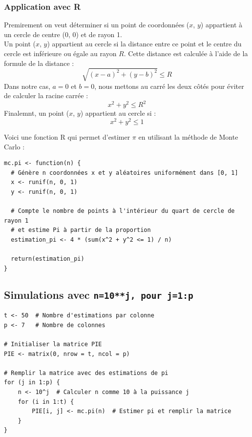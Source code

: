 \documentclass[a4paper,12pt]{article}
\begin{document}
\subsubsection{Application avec R}

Premirement on veut déterminer si un point de coordonnées ($x$, $y$) appartient à un cercle de centre (0, 0) et de rayon 1.
\\[1\baselineskip]
Un point ($x$, $y$) appartient au cercle si la distance entre ce point et le centre du cercle est inférieure ou égale au rayon $R$. Cette distance est calculée à l'aide de la formule de la distance :
\[
\sqrt{(x - a)^2 + (y - b)^2} \leq R
\]
Dans notre cas, $a = 0$ et $b = 0$, nous mettons au carré les deux côtés pour éviter de calculer la racine carrée  :
\[
x^2 + y^2 \leq R^2
\]
Finalemnt, un point ($x$, $y$) appartient au cercle si :
\[
x^2 + y^2 \leq 1
\]

\newpage

Voici une fonction R qui permet d'estimer $\pi$ en utilisant la méthode de Monte Carlo :

\begin{lstlisting}
mc.pi <- function(n) {
  # Génère n coordonnées x et y aléatoires uniformément dans [0, 1]
  x <- runif(n, 0, 1)
  y <- runif(n, 0, 1)
  
  # Compte le nombre de points à l'intérieur du quart de cercle de rayon 1
  # et estime Pi à partir de la proportion
  estimation_pi <- 4 * (sum(x^2 + y^2 <= 1) / n)
  
  return(estimation_pi) 
}
\end{lstlisting}

\subsection{Simulations avec \texttt{n=10**j, pour j=1:p} }


\begin{lstlisting}
t <- 50  # Nombre d'estimations par colonne
p <- 7   # Nombre de colonnes

# Initialiser la matrice PIE
PIE <- matrix(0, nrow = t, ncol = p)

# Remplir la matrice avec des estimations de pi
for (j in 1:p) {
    n <- 10^j  # Calculer n comme 10 à la puissance j
    for (i in 1:t) {
        PIE[i, j] <- mc.pi(n)  # Estimer pi et remplir la matrice
    }
}
  \end{lstlisting}
\end{document}
